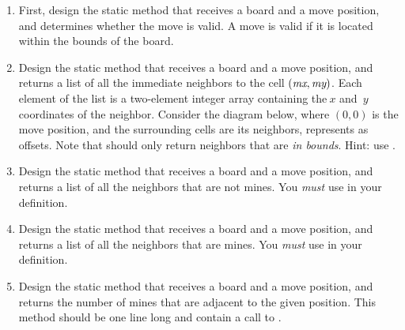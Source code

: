 \begin{enumerate}[label=(\alph*)]
    \item First, design the static  met\-hod that receives a board and a move position, and determines whether the move is valid. A move is valid if it is located within the bounds of the board.
    \item Design the static  method that receives a board and a move position, and returns a list of all the immediate neighbors to the cell $(\emph{mx}, \emph{my})$. 
    Each element of the list is a two-element integer array containing the$~x$ and~$y$ coordinates of the neighbor.
    Consider the diagram below, where $(0, 0)$ is the move position, and the surrounding cells are its neighbors, represents as offsets.
    Note that  should only return neighbors that are \emph{in bounds}. 
    Hint: use .

\begin{center}
\end{center}

    \item Design the static  method that receives a board and a move position, and returns a list of all the neighbors that are not mines. You \emph{must} use  in your definition.

    \item Design the static  method that receives a board and a move position, and returns a list of all the neighbors that are mines. You \emph{must} use  in your definition.

    \item Design the static  method that receives a board and a move position, and returns the number of mines that are adjacent to the given position. This method should be one line long and contain a call to .


\end{enumerate}
